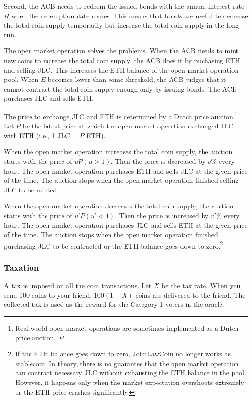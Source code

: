 \documentclass[dvipdfmx,a4paper]{article}
\begin{document}
Second, the ACB needs to redeem the issued bonds with the annual interest rate $R$ when the redemption date comes. This means that bonds are useful to decrease the total coin supply temporarily but increase the total coin supply in the long run.

The open market operation solves the problems. When the ACB needs to mint new coins to increase the total coin supply, the ACB does it by puchasing ETH and selling JLC. This increases the ETH balance of the open market operation pool. When $E$ becomes lower than some threshold, the ACB judges that it cannot contract the total coin supply enough only by issuing bonds. The ACB purchases JLC and sells ETH.

The price to exchange JLC and ETH is determined by a Dutch price auction.\footnote{Real-world open market operations are sometimes implemented as a Dutch price auction.~\cite{ayuso2003model}} Let $P$ be the latest price at which the open market operation exchanged JLC with ETH (i.e., 1 JLC = $P$ ETH).

When the open market operation increases the total coin supply, the auction starts with the price of $uP (u>1)$. Then the price is decreased by $v$\% every hour. The open market operation purchases ETH and sells JLC at the given price of the time. The auction stops when the open market operation finished selling JLC to be minted.

When the open market operation decreases the total coin supply, the auction starts with the price of $u'P (u'<1)$. Then the price is increased by $v'$\% every hour. The open market operation purchases JLC and sells ETH at the given price of the time. The auction stops when the open market operation finished purchasing JLC to be contracted or the ETH balance goes down to zero.\footnote{If the ETH balance goes down to zero, JohnLawCoin no longer works as stablecoin. In theory, there is no guarantee that the open market operation can contract necessary JLC without exhausting the ETH balance in the pool. However, it happens only when the market expectation overshoots extremely or the ETH price crashes significantly.}

\subsubsection{Taxation}

A tax is imposed on all the coin transactions. Let $X$ be the tax rate. When you send 100 coins to your friend, $100(1-X)$ coins are delivered to the friend. The collected tax is used as the reward for the Category-1 voters in the oracle.
\end{document}
